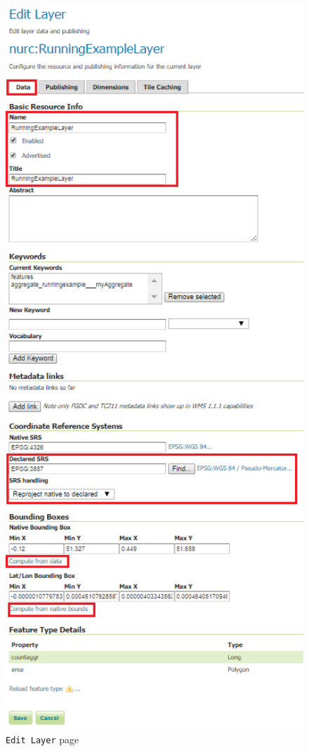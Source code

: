 \begin{figure}[h!tb]
\begin{minipage}{0.5\textwidth}
			\caption{\label{fig:createstore}\lstinline|New Vector Data Source|}
		\end{minipage}\hfill
		\begin{minipage}{0.5\textwidth}
			\includegraphics[width=1.11\textwidth]{Figures/EditLayer_Data.png}
			\caption{\label{fig:editlayerdata}\lstinline|Edit Layer| page}
		\end{minipage}
\end{figure}

